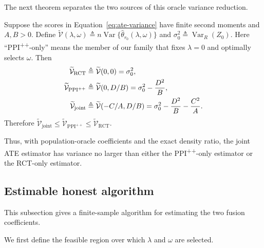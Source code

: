 The next theorem separates the two sources of this oracle variance reduction.

\begin{theorem}
\label{thm:ate-three-way-comparison}
	Suppose the scores in Equation~\eqref{eq:ate-variance} have finite second
	moments and $A,B>0$. Define
$\widetilde{\mathcal V}(\lambda,\omega) \triangleq n\operatorname{Var}\{\widehat\theta_{r_0}(\lambda,\omega)\}$ and $\sigma_0^2\triangleq\operatorname{Var}_R(Z_0)$. Here ``PPI\textsuperscript{++}-only'' means the member of our family that fixes $\lambda=0$ and optimally selects $\omega$. Then
\begin{align}
	\widetilde{\mathcal V}_{\mathrm{RCT}}
	&\triangleq\widetilde{\mathcal V}(0,0)=\sigma_0^2,
	\notag\\
	\widetilde{\mathcal V}_{\mathrm{PPI}^{++}}
	&\triangleq\widetilde{\mathcal V}(0,D/B)
	=\sigma_0^2-\frac{D^2}{B},
	\notag\\
	\widetilde{\mathcal V}_{\mathrm{joint}}
	&\triangleq\widetilde{\mathcal V}(-C/A,D/B)
	=\sigma_0^2-\frac{D^2}{B}-\frac{C^2}{A}.
	\label{eq:ate-three-way-variance}
\end{align}
Therefore $\widetilde{\mathcal V}_{\mathrm{joint}} \leq\widetilde{\mathcal V}_{\mathrm{PPI}^{++}} \leq\widetilde{\mathcal V}_{\mathrm{RCT}}$.
\end{theorem}

Thus, with population-oracle coefficients and the exact density ratio, the joint ATE estimator has variance no larger than either the PPI\textsuperscript{++}-only estimator or the RCT-only estimator.

\subsection{Estimable honest algorithm}

This subsection gives a finite-sample algorithm for estimating the two fusion coefficients.

We first define the feasible region over which $\lambda$ and $\omega$ are selected.

